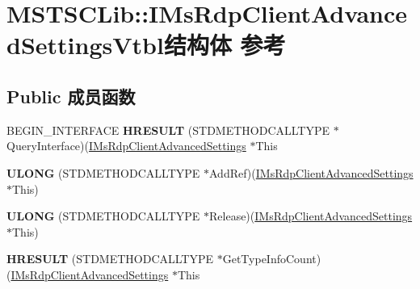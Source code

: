 \hypertarget{struct_m_s_t_s_c_lib_1_1_i_ms_rdp_client_advanced_settings_vtbl}{}\section{M\+S\+T\+S\+C\+Lib\+:\+:I\+Ms\+Rdp\+Client\+Advanced\+Settings\+Vtbl结构体 参考}
\label{struct_m_s_t_s_c_lib_1_1_i_ms_rdp_client_advanced_settings_vtbl}
\subsection*{Public 成员函数}
\begin{DoxyCompactItemize}
\item 
\mbox{\label{struct_m_s_t_s_c_lib_1_1_i_ms_rdp_client_advanced_settings_vtbl_aa36e19f32da3e9c5eeda514be1b90f91}} 
B\+E\+G\+I\+N\+\_\+\+I\+N\+T\+E\+R\+F\+A\+CE {\bfseries H\+R\+E\+S\+U\+LT} (S\+T\+D\+M\+E\+T\+H\+O\+D\+C\+A\+L\+L\+T\+Y\+PE $\ast$Query\+Interface)(\hyperlink{interface_m_s_t_s_c_lib_1_1_i_ms_rdp_client_advanced_settings}{I\+Ms\+Rdp\+Client\+Advanced\+Settings} $\ast$This
\item 
\mbox{\label{struct_m_s_t_s_c_lib_1_1_i_ms_rdp_client_advanced_settings_vtbl_a388a11cbd89275f1eb6a10ea0402cf94}} 
{\bfseries U\+L\+O\+NG} (S\+T\+D\+M\+E\+T\+H\+O\+D\+C\+A\+L\+L\+T\+Y\+PE $\ast$Add\+Ref)(\hyperlink{interface_m_s_t_s_c_lib_1_1_i_ms_rdp_client_advanced_settings}{I\+Ms\+Rdp\+Client\+Advanced\+Settings} $\ast$This)
\item 
\mbox{\label{struct_m_s_t_s_c_lib_1_1_i_ms_rdp_client_advanced_settings_vtbl_aa35b550602b7ce93090cefefe2e45857}} 
{\bfseries U\+L\+O\+NG} (S\+T\+D\+M\+E\+T\+H\+O\+D\+C\+A\+L\+L\+T\+Y\+PE $\ast$Release)(\hyperlink{interface_m_s_t_s_c_lib_1_1_i_ms_rdp_client_advanced_settings}{I\+Ms\+Rdp\+Client\+Advanced\+Settings} $\ast$This)
\item 
\mbox{\label{struct_m_s_t_s_c_lib_1_1_i_ms_rdp_client_advanced_settings_vtbl_a2e4cc65534a1281434e7f3c8f8a0809e}} 
{\bfseries H\+R\+E\+S\+U\+LT} (S\+T\+D\+M\+E\+T\+H\+O\+D\+C\+A\+L\+L\+T\+Y\+PE $\ast$Get\+Type\+Info\+Count)(\hyperlink{interface_m_s_t_s_c_lib_1_1_i_ms_rdp_client_advanced_settings}{I\+Ms\+Rdp\+Client\+Advanced\+Settings} $\ast$This

\end{DoxyCompactItemize}
